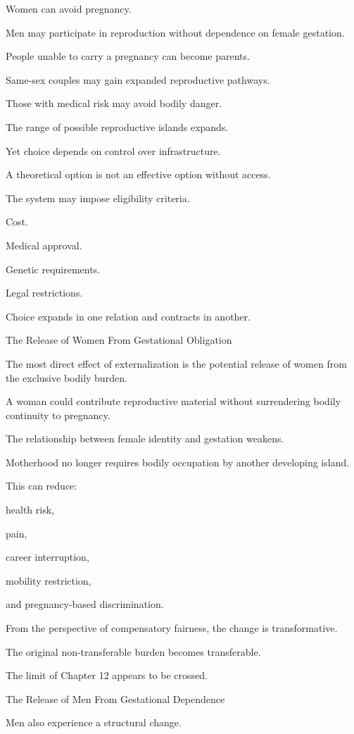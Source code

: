 Women can avoid pregnancy.

Men may participate in reproduction without dependence on female gestation.

People unable to carry a pregnancy can become parents.

Same-sex couples may gain expanded reproductive pathways.

Those with medical risk may avoid bodily danger.

The range of possible reproductive islands expands.

Yet choice depends on control over infrastructure.

A theoretical option is not an effective option without access.

The system may impose eligibility criteria.

Cost.

Medical approval.

Genetic requirements.

Legal restrictions.

Choice expands in one relation and contracts in another.

The Release of Women From Gestational Obligation

The most direct effect of externalization is the potential release of women from the exclusive bodily burden.

A woman could contribute reproductive material without surrendering bodily continuity to pregnancy.

The relationship between female identity and gestation weakens.

Motherhood no longer requires bodily occupation by another developing island.

This can reduce:

health risk,

pain,

career interruption,

mobility restriction,

and pregnancy-based discrimination.

From the perspective of compensatory fairness, the change is transformative.

The original non-transferable burden becomes transferable.

The limit of Chapter 12 appears to be crossed.

The Release of Men From Gestational Dependence

Men also experience a structural change.

